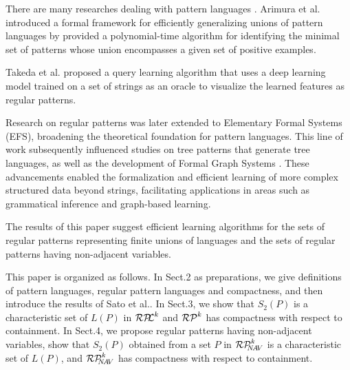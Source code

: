 %
%

There are many researches dealing with pattern languages \cite{Angluin1980b,Wright1989,Sato1,Shinohara2000,Day2017,Matsumoto2020,Taketa2022}.
Arimura et al. \cite{Arimura1994} introduced a formal framework for efficiently generalizing unions of pattern languages by provided a polynomial-time algorithm for identifying the minimal set of patterns whose union encompasses a given set of positive examples.  

Takeda et al. \cite{Taketa2022} proposed a query learning algorithm that uses a deep learning model trained on a set of strings as an oracle to visualize the learned features as regular patterns.

Research on regular patterns was later extended to Elementary Formal Systems (EFS)\cite{Arikawa1992}, broadening the theoretical foundation for pattern languages. This line of work subsequently influenced studies on tree patterns \cite{Arimura1997,Suzuki2006} that generate tree languages, as well as the development of Formal Graph Systems \cite{Uchida1994}. These advancements enabled the formalization and efficient learning of more complex structured data beyond strings, facilitating applications in areas such as grammatical inference and graph-based learning.

The results of this paper suggest efficient learning algorithms for the sets of regular patterns representing finite unions of languages and the sets of regular patterns having non-adjacent variables.


This paper is organized as follows.
In Sect.2 as preparations, we give definitions of pattern languages, regular pattern languages and compactness, and then introduce the results of Sato et al.\cite{Sato1}.
In Sect.3, we show that $S_{2}(P)$ is a characteristic set of $L(P)$ in $\mathcal{RP\!\!L}^{k}$ and $\mathcal{RP}^{k}$ has compactness with respect to containment.
In Sect.4, we propose regular patterns having non-adjacent variables, show that $S_2(P)$ obtained from a set $P$ in $\mathcal{RP}^{k}_{\!\!\!N\!A\!V}$ is a characteristic set of $L(P)$, and $\mathcal{RP}^{k}_{\!\!\!N\!A\!V}$ has compactness with respect to containment.

